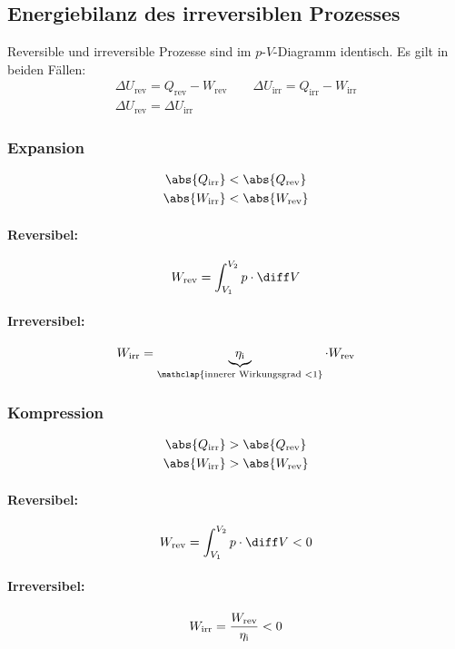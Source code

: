 	\subsection{Energiebilanz des irreversiblen Prozesses} %
		Reversible und irreversible Prozesse sind im $p$-$V$-Diagramm identisch. Es gilt in beiden Fällen:
		\begin{gather*}
			\Delta U_{\text{rev}} = Q_{\text{rev}} - W_{\text{rev}} \qquad
			\Delta U_{\text{irr}} = Q_{\text{irr}} - W_{\text{irr}} \\
			\Delta U_{\text{rev}} = \Delta U_{\text{irr}}
		\end{gather*}
		\begin{multicols}{2}
			\subsubsection{Expansion} %
				\begin{gather*}
					\abs{Q_{\text{irr}}} < \abs{Q_{\text{rev}}} \\
					\abs{W_{\text{irr}}} < \abs{W_{\text{rev}}}
				\end{gather*}
				\paragraph{Reversibel:} %
					\[
						W_{\text{rev}} = \int_{V_1}^{V_2} p \cdot \diff V
					\]
				\paragraph{Irreversibel:} %
					\[
						W_{\text{irr}} = \underbrace{\eta_{\text{i}}}_{\mathclap{\text{innerer Wirkungsgrad }< 1}} \cdot W_{\text{rev}}
					\]
			\subsubsection{Kompression} %
				\begin{gather*}
					\abs{Q_{\text{irr}}} > \abs{Q_{\text{rev}}} \\
					\abs{W_{\text{irr}}} > \abs{W_{\text{rev}}}
				\end{gather*}
				\paragraph{Reversibel:} %
					\[
						W_{\text{rev}} = \int_{V_1}^{V_2} p \cdot \diff V < 0
					\]
				\paragraph{Irreversibel:} %
					\[
						W_{\text{irr}} = \frac{W_{\text{rev}}}{\eta_{\text{i}}} < 0 \vphantom{\underbrace{\eta_{\text{i}}}_{\mathclap{\text{innerer Wirkungsgrad }< 1}}}
					\]
			
		\end{multicols}
	
